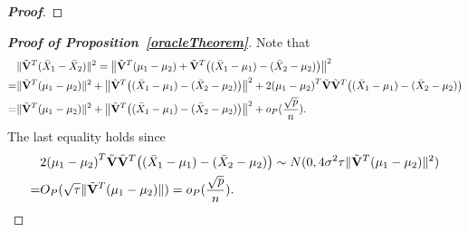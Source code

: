 \documentclass[3p]{elsarticle}
\theoremstyle{plain}
\theoremstyle{definition}
\theoremstyle{remark}
\begin{document}
\begin{appendices}
\begin{proof}[\textbf{Proof}]
\end{proof}


\begin{proof}[\textbf{Proof of Proposition~\ref{oracleTheorem}}]
Note that
    \begin{equation}\label{qiguaile}
        \begin{aligned}
            &\|\tilde{\mathbf{V}}^T(\bar{X}_1-\bar{X}_2)\|^2
            =\big\|\tilde{\mathbf{V}}^T(\mu_1-\mu_2)+\tilde{\mathbf{V}}^T\big((\bar{X}_1-\mu_1)-(\bar{X}_2-\mu_2)\big)\big\|^2\\
            =&\|\tilde{\mathbf{V}}^T(\mu_1-\mu_2)\|^2+
            \big\|\tilde{\mathbf{V}}^T\big((\bar{X}_1-\mu_1)-(\bar{X}_2-\mu_2)\big)\big\|^2+
            2{(\mu_1-\mu_2)}^T\tilde{\mathbf{V}}\tilde{\mathbf{V}}^T\big((\bar{X}_1-\mu_1)-(\bar{X}_2-\mu_2)\big)\\
            =&\|\tilde{\mathbf{V}}^T(\mu_1-\mu_2)\|^2+
            \big\|\tilde{\mathbf{V}}^T\big((\bar{X}_1-\mu_1)-(\bar{X}_2-\mu_2)\big)\big\|^2+
            o_P(\frac{\sqrt{p}}{n}).
        \end{aligned}
    \end{equation}
    The last equality holds since
    \begin{equation*}
        \begin{aligned}
            &2{(\mu_1-\mu_2)}^T\tilde{\mathbf{V}}\tilde{\mathbf{V}}^T\big((\bar{X}_1-\mu_1)-(\bar{X}_2-\mu_2)\big)\sim N(0,4\sigma^2 \tau \|\tilde{\mathbf{V}}^T(\mu_1-\mu_2)\|^2)\\
            =& O_P(\sqrt{\tau}\|\tilde{\mathbf{V}}^T(\mu_1-\mu_2)\| )=o_P(\frac{\sqrt{p}}{n}).
        \end{aligned}
    \end{equation*}


\end{proof}
\end{appendices}
\end{document}
